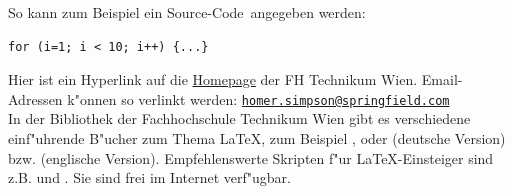 \documentclass[a4paper,bibtotoc,oneside]{scrbook}
\begin{document}
\noindent
So kann zum Beispiel ein \glqq Source-Code\grqq\  angegeben werden: 
\begin{verbatim}
for (i=1; i < 10; i++) {...} 
\end{verbatim}

\noindent
Hier ist ein Hyperlink auf die  \href{http://www.technikum-wien.at}{Homepage} der FH Technikum Wien. Email-Adressen k"onnen so verlinkt werden: \href{mailto:homer.simpson@springfield.com}{\texttt{homer.simpson@springfield.com}}\\

\noindent
In der Bibliothek der Fachhochschule Technikum Wien gibt es verschiedene einf"uhrende B"ucher zum Thema \glqq \LaTeX \grqq, zum Beispiel \cite{kop05}, \cite{wil06} oder \cite{mgb+05d} (deutsche Version) bzw. \cite{mgb+04e} (englische Version). Empfehlenswerte Skripten f"ur \LaTeX-Einsteiger sind z.B. \cite{mj00} und \cite{mj95}. Sie sind frei im Internet verf"ugbar.






\listoffigures
{} %
\newpage

\listoftables 
{} %
\newpage
\end{document}
